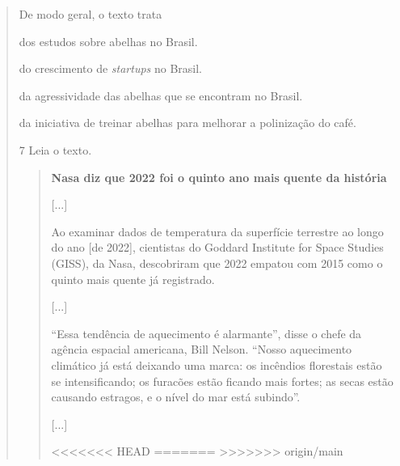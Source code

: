 \begin{quote}
De modo geral, o texto trata

\begin{escolha}
\item dos estudos sobre abelhas no Brasil.

\item do crescimento de \textit{startups} no Brasil.

\item da agressividade das abelhas que se encontram no Brasil.

\item da iniciativa de treinar abelhas para melhorar a polinização do café.
\end{escolha}


\num{7} Leia o texto.

\begin{quote}
\textbf{Nasa diz que 2022 foi o quinto ano mais quente da história}

{[}...{]}

Ao examinar dados de temperatura da superfície terrestre ao longo do ano
[de 2022], cientistas do Goddard Institute for Space Studies (GISS), da
Nasa, descobriram que 2022 empatou com 2015 como o quinto mais quente já
registrado.

{[}...{]}

“Essa tendência de aquecimento é alarmante”, disse o chefe da agência
espacial americana, Bill Nelson. “Nosso aquecimento climático já está
deixando uma marca: os incêndios florestais estão se intensificando; os
furacões estão ficando mais fortes; as secas estão causando estragos, e
o nível do mar está subindo”.

{[}...{]}

<<<<<<< HEAD
=======
>>>>>>> origin/main
\end{quote}


\end{quote}
